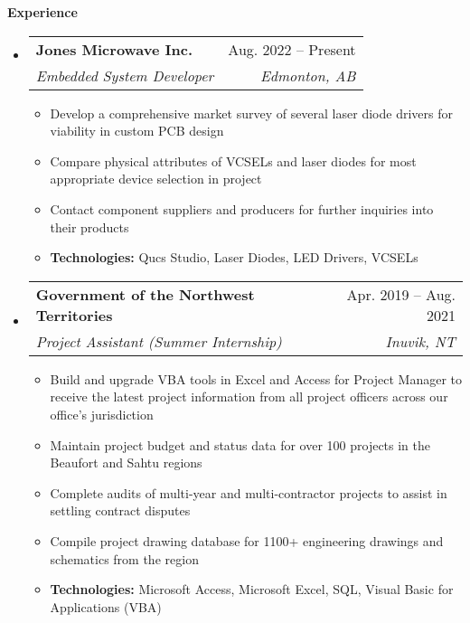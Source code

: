 \documentclass[letterpaper,12pt]{article}[leftmargin=*]
\makeatletter
\def \entryspacing {-0pt}
\renewcommand{\section}[2]{\vspace{5pt}
  \colorbox{secondary}{\color{white}\raggedbottom\normalsize\textbf{{#1}{\hspace{7pt}#2}}}
}
\newcommand{\resumeEntryStart}{\begin{itemize}[leftmargin=2.5mm]}
\newcommand{\resumeEntryEnd}{\end{itemize}\vspace{\entryspacing}}
\newcommand{\resumeItemListStart}{\begin{itemize}[leftmargin=4.5mm]}
\newcommand{\resumeItemListEnd}{\end{itemize}}
\newcommand{\resumeItem}[1]{
  \item\small{
    {#1 \vspace{-2pt}}
  }
}
\newcommand{\resumeEntryTSDL}[4]{
  \vspace{-1pt}\item[]
    \begin{tabularx}{0.97\textwidth}{X@{\hspace{60pt}}r}
      \textbf{\color{primary}#1} & {\firabook\color{accent}\small#2} \\
      \textit{\color{accent}\small#3} & \textit{\color{accent}\small#4} \\
    \end{tabularx}\vspace{-6pt}
}
\makeatother
\begin{document}
\section{\faPieChart}{Experience}

  \resumeEntryStart
    \resumeEntryTSDL
      {Jones Microwave Inc.}{Aug. 2022 -- Present}
      {Embedded System Developer}{Edmonton, AB}
    \resumeItemListStart
      \resumeItem {Develop a comprehensive market survey of several laser diode drivers for viability in custom PCB design}
      \resumeItem {Compare physical attributes of VCSELs and laser diodes for most appropriate device selection in project}
      \resumeItem {Contact component suppliers and producers for further inquiries into their products}
      \resumeItem {\textbf{Technologies:} Qucs Studio, Laser Diodes, LED Drivers, VCSELs}
    \resumeItemListEnd
  \resumeEntryEnd


  \resumeEntryStart
    \resumeEntryTSDL
      {Government of the Northwest Territories}{Apr. 2019 -- Aug. 2021}
      {Project Assistant (Summer Internship)}{Inuvik, NT}
    \resumeItemListStart
      \resumeItem {Build and upgrade VBA tools in Excel and Access for Project Manager to receive the latest
      project information from all project officers across our office's jurisdiction}
      \resumeItem {Maintain project budget and status data for over 100 projects in the Beaufort and Sahtu regions}
      \resumeItem {Complete audits of multi-year and multi-contractor projects to assist in settling contract disputes}
      \resumeItem {Compile project drawing database for 1100+ engineering drawings and schematics from the region}
      \resumeItem {\textbf{Technologies:} Microsoft Access, Microsoft Excel, SQL, Visual Basic for Applications (VBA)}
    \resumeItemListEnd
  \resumeEntryEnd
\end{document}

